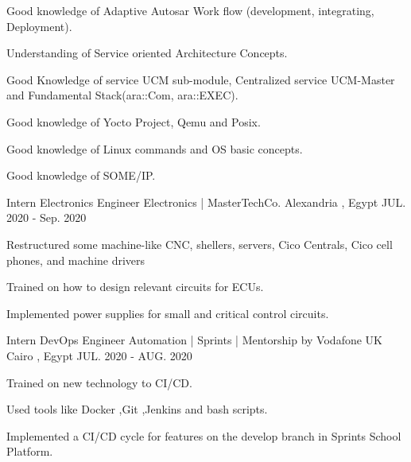 \begin{cventries}
{\begin{cvitems}
        \item {\normalsize Good knowledge of Adaptive Autosar Work flow (development, integrating, Deployment).}
        \item {\normalsize Understanding of Service oriented Architecture Concepts.}
        \item {\normalsize Good Knowledge of service UCM sub-module, Centralized service UCM-Master and Fundamental Stack(ara::Com, ara::EXEC).}
        \item {\normalsize Good knowledge of Yocto Project, Qemu and Posix.}
        \item {\normalsize Good knowledge of Linux commands and OS basic concepts.}
        \item{\normalsize Good knowledge of SOME/IP.}
      \end{cvitems}
    }
  \cventry
    {\normalsize Intern Electronics Engineer} %
    {\newline \Large Electronics | \color{blue}MasterTechCo.} %
    {\normalsize Alexandria , Egypt} %
    {\normalsize JUL. 2020 - Sep. 2020} %
    {
      \begin{cvitems} %
        \item{\normalsize Restructured some machine-like CNC, shellers, servers, Cico Centrals, Cico cell phones, and machine drivers}
        \item{\normalsize Trained on how to design relevant circuits for ECUs.}
        \item{\normalsize Implemented power supplies for small and critical control circuits.}
      \end{cvitems}
    }
\cventry
{\normalsize Intern DevOps Engineer} %
{\newline \Large Automation | \color{blue}Sprints | \color{red}Mentorship by Vodafone UK} %
{\normalsize Cairo , Egypt} %
{\normalsize JUL. 2020 - AUG. 2020} %
{
  \begin{cvitems} %
    \item{\normalsize Trained on new technology to CI/CD.}
    \item{\normalsize Used tools like Docker ,Git ,Jenkins and bash scripts.}
    \item{\normalsize Implemented a CI/CD cycle for features on the develop branch in Sprints School Platform.}
  \end{cvitems}
}
\end{cventries}

